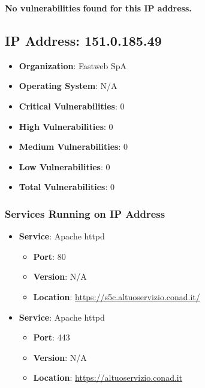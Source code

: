 \documentclass{article}
\begin{document}
\textbf{No vulnerabilities found for this IP address.}




\clearpage



\subsection*{IP Address: 151.0.185.49}

\begin{itemize}
    \item \textbf{Organization}: Fastweb SpA
    \item \textbf{Operating System}:  N/A 
    \item \textbf{Critical Vulnerabilities}: 0
    \item \textbf{High Vulnerabilities}: 0
    \item \textbf{Medium Vulnerabilities}: 0
    \item \textbf{Low Vulnerabilities}: 0
    \item \textbf{Total Vulnerabilities}: 0
\end{itemize}

\subsubsection*{Services Running on IP Address}

\begin{itemize}
    
        \item \textbf{Service}: Apache httpd
        \begin{itemize}
            \item \textbf{Port}: 80
            \item \textbf{Version}:  N/A 
            \item \textbf{Location}: \href{ https://s5c.altuoservizio.conad.it/ }{ https://s5c.altuoservizio.conad.it/ }
        \end{itemize}
    
        \item \textbf{Service}: Apache httpd
        \begin{itemize}
            \item \textbf{Port}: 443
            \item \textbf{Version}:  N/A 
            \item \textbf{Location}: \href{ https://altuoservizio.conad.it }{ https://altuoservizio.conad.it }
        \end{itemize}
    
\end{itemize}
\end{document}
